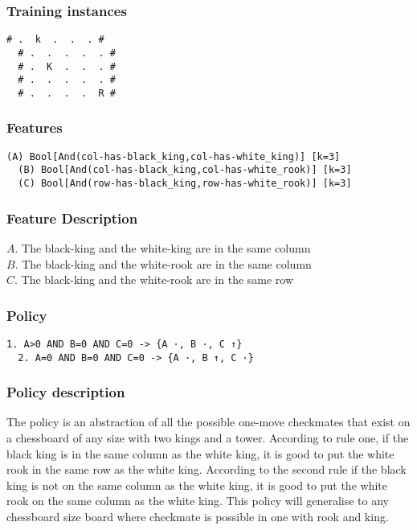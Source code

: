 \documentclass[a4paper]{article}
\begin{document}
\subsubsection{Training instances}
\begin{Verbatim}[fontsize=\footnotesize]
  # .  k  .  .  . #
  # .  .  .  .  . #
  # .  K  .  .  . #
  # .  .  .  .  . #
  # .  .  .  .  R #
\end{Verbatim}

\subsubsection{Features}
\begin{Verbatim}[fontsize=\footnotesize]
  (A) Bool[And(col-has-black_king,col-has-white_king)] [k=3]
  (B) Bool[And(col-has-black_king,col-has-white_rook)] [k=3]
  (C) Bool[And(row-has-black_king,row-has-white_rook)] [k=3]
\end{Verbatim}

\subsubsection{Feature Description}
$A$. The black-king and the white-king are in the same column\\
$B$. The black-king and the white-rook are in the same column\\
$C$. The black-king and the white-rook are in the same row

\subsubsection{Policy}
\begin{Verbatim}[fontsize=\footnotesize]
  1. A>0 AND B=0 AND C=0 -> {A ·, B ·, C ↑}
  2. A=0 AND B=0 AND C=0 -> {A ·, B ↑, C ·}
\end{Verbatim}

\subsubsection{Policy description}
The policy is an abstraction of all the possible one-move checkmates that exist on a chessboard of any size with two kings and a tower. According to rule one, if the black king is in the same column as the white king, it is good to put the white rook in the same row as the white king. According to the second rule if the black king is not on the same column as the white king, it is good to put the white rook on the same column as the white king. This policy will generalise to any chessboard size board where checkmate is possible in one with rook and king.
\end{document}
